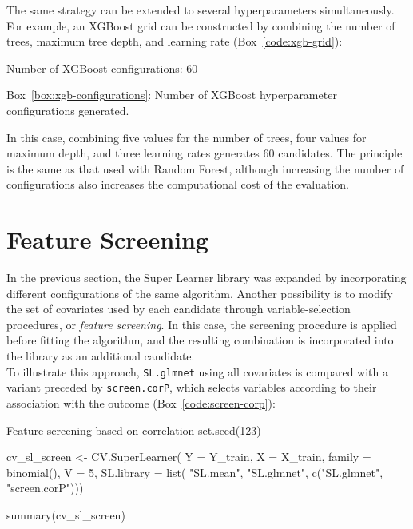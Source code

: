 \documentclass[12pt]{article}
\newcommand{\routputcaption}[2]{%
    \par\smallskip
    \begin{center}
        Box~\ref{#1}: #2
    \end{center}
}
\begin{document}
The same strategy can be extended to several hyperparameters simultaneously. For example, an XGBoost grid can be constructed by combining the number of trees, maximum tree depth, and learning rate (Box~\ref{code:xgb-grid}):


\begin{routputref}[label={box:xgb-configurations}]
	Number of XGBoost configurations: 60
\end{routputref}

\routputcaption{box:xgb-configurations}
{Number of XGBoost hyperparameter configurations generated.}

In this case, combining five values for the number of trees, four values for maximum depth, and three learning rates generates 60 candidates. The principle is the same as that used with Random Forest, although increasing the number of configurations also increases the computational cost of the evaluation.

\section{Feature Screening}

In the previous section, the Super Learner library was expanded by incorporating different configurations of the same algorithm. Another possibility is to modify the set of covariates used by each candidate through variable-selection procedures, or \textit{feature screening}. In this case, the screening procedure is applied before fitting the algorithm, and the resulting combination is incorporated into the library as an additional candidate. \\
To illustrate this approach, \texttt{SL.glmnet} using all covariates is compared with a variant preceded by \texttt{screen.corP}, which selects variables according to their association with the outcome (Box~\ref{code:screen-corp}):

\begin{rcode}[label={code:screen-corp}]{Feature screening based on correlation}
	set.seed(123)
	
	cv_sl_screen <- CV.SuperLearner(
	Y = Y_train, X = X_train,
	family = binomial(),
	V = 5,
	SL.library = list(
	"SL.mean",
	"SL.glmnet",
	c("SL.glmnet", "screen.corP")))
	
	summary(cv_sl_screen)
\end{rcode}
\end{document}
